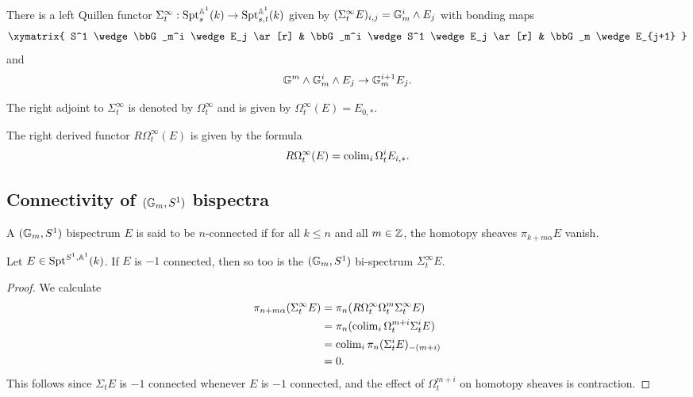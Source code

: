 \documentclass{amsart}%
\begin{document}
\begin{proposition}
  There is a left Quillen functor
  $\Sigma^{\infty}_t : \mathrm{Spt}_s^{\mathbb{A}^1}(k) \to \mathrm{Spt}_{s,t}^{\mathbb{A}^1}(k)$
  given by $(\Sigma^{\infty}_tE)_{i,j} = \mathbb{G}_m^i\wedge E_j$ with bonding maps 
  \begin{equation*}
    \xymatrix{
      S^1 \wedge \bbG_m^i \wedge E_j \ar[r] & \bbG_m^i \wedge S^1 \wedge E_j \ar[r] & \bbG_m \wedge E_{j+1}
    }
  \end{equation*}
  and 
  \begin{equation*}
    \mathbb{G}^m \wedge \mathbb{G}_m^i \wedge E_j \to \mathbb{G}_m^{i+1} E_j.
  \end{equation*}

  The right adjoint to $\Sigma^{\infty}_t$ is denoted by
  $\Omega^{\infty}_t$ and is given by
  $\Omega^{\infty}_t(E) = E_{0,*}$.

  The right derived functor $R\Omega^{\infty}_t(E)$ is given by the formula 
  \begin{equation*}
    R\Omega^{\infty}_t(E) = \operatorname{colim}_i \Omega_t^i E_{i,*}.
  \end{equation*}
\end{proposition}

\subsection{Connectivity of $(\mathbb{G}_m, S^1)$ bispectra}

\begin{definition}
  A $(\mathbb{G}_m, S^1)$ bispectrum $E$ is said to be $n$-connected if for
  all $k\leq n$ and all $m \in \mathbb{Z}$, the homotopy sheaves
  $\pi_{k + m\alpha}E$ vanish.
\end{definition}

\begin{proposition}
  Let $E \in \mathrm{Spt}^{S^1,\mathbb{A}^1}(k)$. If $E$ is $-1$ connected, then so
  too is the $(\mathbb{G}_m,S^1)$ bi-spectrum $\Sigma^{\infty}_t E$.
\end{proposition}

\begin{proof}
  We calculate
  \begin{align*}
    \pi_{n+m\alpha}(\Sigma^{\infty}_t E) 
    & = \pi_n(R\Omega^{\infty}_t\Omega_t^m \Sigma^{\infty}_t E) \\ 
    & = \pi_n (\operatorname{colim}_i \Omega_t^{m+i}\Sigma_t^{i} E) \\
    & = \operatorname{colim}_i \pi_n (\Sigma_t^{i}E)_{-(m+i)}\\
    & = 0.
  \end{align*}
  This follows since $\Sigma_tE$ is $-1$ connected whenever $E$ is
  $-1$ connected, and the effect of $\Omega_t^{m+i}$ on homotopy
  sheaves is contraction.
\end{proof}
\end{document}
